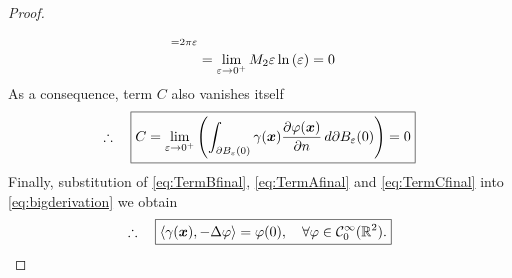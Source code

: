 \documentclass[12pt]{article}
\begin{document}
\begin{proof}
\begin{align}
		_{=2\pi\varepsilon}                                                       \notag \\
		 & = \lim_{\varepsilon\to 0^+} M_{2}
		\varepsilon \ln{(\varepsilon)} = 0
	\end{align}
	As a consequence, term $C$ also vanishes itself
	\begin{align}
		\label{eq:TermCfinal}
		\therefore\quad\boxed{
			C 
			= 
			\lim_{\varepsilon\to 0^+}
			\left(
			\int_{\partial B_\varepsilon(0)} \gamma({\boldsymbol{\mathnormal x}})
			\frac{\partial\varphi({\boldsymbol{\mathnormal x}})}{\partial n}\, d\partial B_{\varepsilon}(0)
			\right)
			= 0
		}
	\end{align}
	Finally, substitution of \eqref{eq:TermBfinal}, \eqref{eq:TermAfinal} and \eqref{eq:TermCfinal}
	into \eqref{eq:bigderivation} we obtain
	\begin{align}
		\therefore\quad\boxed{
			\langle \gamma({\boldsymbol{\mathnormal x}}),-\Delta \varphi \rangle
			= \varphi(0),
			\quad \forall \varphi \in \mathcal{C}^{\infty}_{0}(\mathbb{R}^2).
		}
	\end{align}
\end{proof}

\newpage
\end{document}

